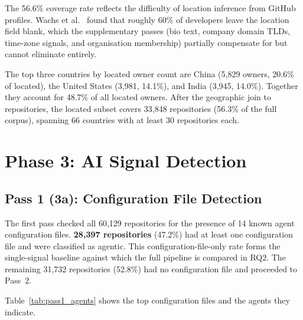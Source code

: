 The 56.6\% coverage rate reflects the difficulty of location inference from GitHub profiles. Wachs et al.~\cite{wachs2022} found that roughly 60\% of developers leave the location field blank, which the supplementary passes (bio text, company domain TLDs, time-zone signals, and organisation membership) partially compensate for but cannot eliminate entirely.

The top three countries by located owner count are China (5,829 owners, 20.6\% of located), the United States (3,981, 14.1\%), and India (3,945, 14.0\%). Together they account for 48.7\% of all located owners. After the geographic join to repositories, the located subset covers 33,848 repositories (56.3\% of the full corpus), spanning 66 countries with at least 30 repositories each.

\section{Phase 3: AI Signal Detection}
\label{sec:res:detection}

\subsection{Pass 1 (3a): Configuration File Detection}

The first pass checked all 60,129 repositories for the presence of 14 known agent configuration files. \textbf{28,397 repositories} (47.2\%) had at least one configuration file and were classified as agentic. This configuration-file-only rate forms the single-signal baseline against which the full pipeline is compared in RQ2. The remaining 31,732 repositories (52.8\%) had no configuration file and proceeded to Pass~2.

Table~\ref{tab:pass1_agents} shows the top configuration files and the agents they indicate.

